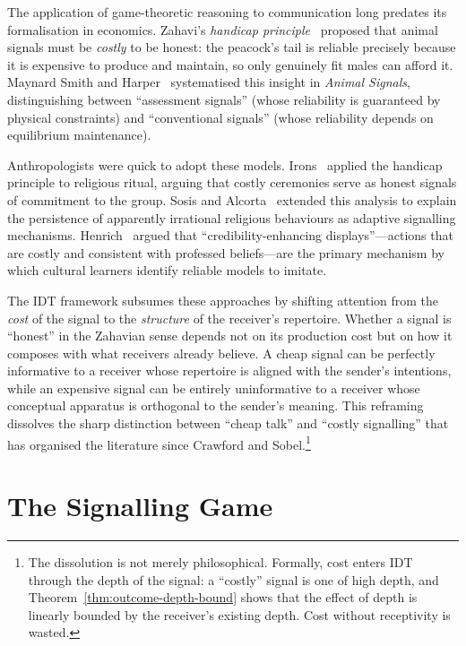 The application of game-theoretic reasoning to communication long
predates its formalisation in economics.  Zahavi's \emph{handicap
principle}~\cite{zahavi1975} proposed that animal signals must be
\emph{costly} to be honest: the peacock's tail is reliable precisely
because it is expensive to produce and maintain, so only genuinely
fit males can afford it.  Maynard Smith and Harper~\cite{maynardsmith2003}
systematised this insight in \emph{Animal Signals}, distinguishing
between ``assessment signals'' (whose reliability is guaranteed by
physical constraints) and ``conventional signals'' (whose reliability
depends on equilibrium maintenance).

Anthropologists were quick to adopt these models.  Irons~\cite{irons2001}
applied the handicap principle to religious ritual, arguing that costly
ceremonies serve as honest signals of commitment to the group.  Sosis
and Alcorta~\cite{sosis2003} extended this analysis to explain the
persistence of apparently irrational religious behaviours as adaptive
signalling mechanisms.  Henrich~\cite{henrich2009} argued that
``credibility-enhancing displays''---actions that are costly and
consistent with professed beliefs---are the primary mechanism by which
cultural learners identify reliable models to imitate.

The IDT framework subsumes these approaches by shifting attention from
the \emph{cost} of the signal to the \emph{structure} of the receiver's
repertoire.  Whether a signal is ``honest'' in the Zahavian sense
depends not on its production cost but on how it composes with what
receivers already believe.  A cheap signal can be perfectly informative
to a receiver whose repertoire is aligned with the sender's intentions,
while an expensive signal can be entirely uninformative to a receiver
whose conceptual apparatus is orthogonal to the sender's meaning.
This reframing dissolves the sharp distinction between ``cheap talk''
and ``costly signalling'' that has organised the literature since
Crawford and Sobel.\footnote{The dissolution is not merely
philosophical.  Formally, cost enters IDT through the depth of the
signal: a ``costly'' signal is one of high depth, and
Theorem~\ref{thm:outcome-depth-bound} shows that the effect of depth
is linearly bounded by the receiver's existing depth.  Cost without
receptivity is wasted.}

\section{The Signalling Game}
\label{sec:ch2:game}

